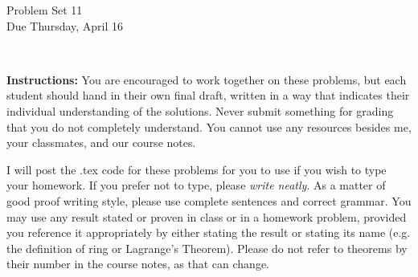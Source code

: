 \documentclass[11pt]{article}
\title{}
\date{\vspace{-0.5in}}
\theoremstyle{definition}
\begin{document}
\thispagestyle{fancy}
\pagestyle{fancy}

\vspace{3em}

\begin{center}
	{\LARGE Problem Set 11 \\}
	Due Thursday, April 16\end{center}

\

\noindent
{\bf Instructions:}
You are encouraged to work together on these problems, but each student should hand in their own final draft, written in a way that indicates their individual understanding of the solutions. Never submit something for grading that you do not completely understand. You cannot use any resources besides me, your classmates, and our course notes.


I will post the .tex code for these problems for you to use if you wish to type your homework. If you prefer not to type, please  {\em write neatly}. As a matter of good proof writing style, please use complete sentences and correct grammar. You may use any result stated or proven in class or in a homework problem, provided you reference it appropriately by either stating the result or stating its name (e.g. the definition of ring or Lagrange's Theorem). Please do not refer to theorems by their number in the course notes, as that can change.
\end{document}
